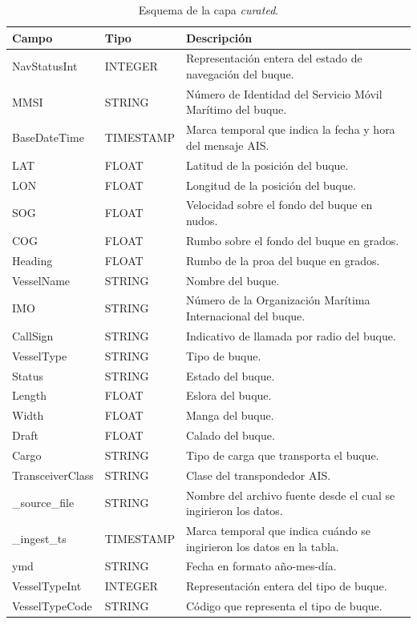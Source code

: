 \documentclass[10pt]{article}
\begin{document}
\begin{table}[H]
  \centering
  \caption{Esquema de la capa \textit{curated}.}
  \label{tab:curated_schema}
  \scriptsize
  \begin{tabular}{@{}llp{8cm}@{}}
  \toprule
  Campo & Tipo & Descripción \\
  \midrule
  NavStatusInt & INTEGER & Representación entera del estado de navegación del buque. \\
  MMSI & STRING & Número de Identidad del Servicio Móvil Marítimo del buque. \\
  BaseDateTime & TIMESTAMP & Marca temporal que indica la fecha y hora del mensaje AIS. \\
  LAT & FLOAT & Latitud de la posición del buque. \\
  LON & FLOAT & Longitud de la posición del buque. \\
  SOG & FLOAT & Velocidad sobre el fondo del buque en nudos. \\
  COG & FLOAT & Rumbo sobre el fondo del buque en grados. \\
  Heading & FLOAT & Rumbo de la proa del buque en grados. \\
  VesselName & STRING & Nombre del buque. \\
  IMO & STRING & Número de la Organización Marítima Internacional del buque. \\
  CallSign & STRING & Indicativo de llamada por radio del buque. \\
  VesselType & STRING & Tipo de buque. \\
  Status & STRING & Estado del buque. \\
  Length & FLOAT & Eslora del buque. \\
  Width & FLOAT & Manga del buque. \\
  Draft & FLOAT & Calado del buque. \\
  Cargo & STRING & Tipo de carga que transporta el buque. \\
  TransceiverClass & STRING & Clase del transpondedor AIS. \\
  \_source\_file & STRING & Nombre del archivo fuente desde el cual se ingirieron los datos. \\
  \_ingest\_ts & TIMESTAMP & Marca temporal que indica cuándo se ingirieron los datos en la tabla. \\
  ymd & STRING & Fecha en formato año-mes-día. \\
  VesselTypeInt & INTEGER & Representación entera del tipo de buque. \\
  VesselTypeCode & STRING & Código que representa el tipo de buque. \\

\end{tabular}
\end{table}
\end{document}
